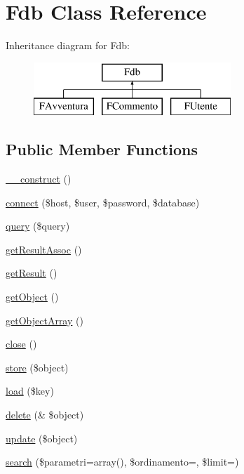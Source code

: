 \hypertarget{class_fdb}{}\section{Fdb Class Reference}
\label{class_fdb}
Inheritance diagram for Fdb\+:\begin{figure}[H]
\begin{center}
\leavevmode
\includegraphics[height=2.000000cm]{class_fdb}
\end{center}
\end{figure}
\subsection*{Public Member Functions}
\begin{DoxyCompactItemize}
\item 
\mbox{\hyperlink{class_fdb_a7d9667ce13aa13c0136744d8e21f5f45}{\+\_\+\+\_\+construct}} ()
\item 
\mbox{\hyperlink{class_fdb_a38c372cac419dbbe96cc4ee4bada7f21}{connect}} (\$host, \$user, \$password, \$database)
\item 
\mbox{\hyperlink{class_fdb_a088aea7a8a3eb0b8c0847f9c148ba0ea}{query}} (\$query)
\item 
\mbox{\hyperlink{class_fdb_a75e9d7f73285b64c4071d72f593ea8cf}{get\+Result\+Assoc}} ()
\item 
\mbox{\hyperlink{class_fdb_a6fcc3963a986e2c75a5573fd5fc29604}{get\+Result}} ()
\item 
\mbox{\hyperlink{class_fdb_abab2d548f08eb274802b87da3abc03fd}{get\+Object}} ()
\item 
\mbox{\hyperlink{class_fdb_ae08a72eb89fb8be9aab10ebc11e9434c}{get\+Object\+Array}} ()
\item 
\mbox{\hyperlink{class_fdb_a39d2934cd845934b97c4935cca62eaf5}{close}} ()
\item 
\mbox{\hyperlink{class_fdb_aecfa6b36d49bf256819ddd4c3f2f810c}{store}} (\$object)
\item 
\mbox{\hyperlink{class_fdb_ace44253c7a593943b41037f5b87ea304}{load}} (\$key)
\item 
\mbox{\hyperlink{class_fdb_ab682bb403956d8beca9258bba5f7d289}{delete}} (\& \$object)
\item 
\mbox{\hyperlink{class_fdb_a6a050a49b34bd44ed78258c661ef929d}{update}} (\$object)
\item 
\mbox{\hyperlink{class_fdb_af388fb9f8c07e9084b963a8c2f0b6ef4}{search}} (\$parametri=array(), \$ordinamento=\textquotesingle{}\textquotesingle{}, \$limit=\textquotesingle{}\textquotesingle{})
\end{DoxyCompactItemize}
